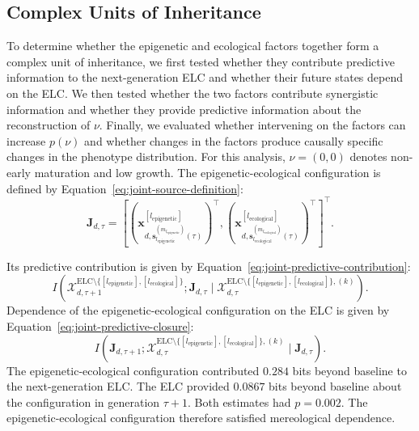 \documentclass[11pt]{article}
\newcommand{\ELC}{\mathrm{ELC}}
\begin{document}
\subsection{Complex Units of Inheritance}
To determine whether the epigenetic and ecological factors together form a complex unit of inheritance, we first tested whether they contribute predictive information to the next-generation ELC and whether their future states depend on the ELC. We then tested whether the two factors contribute synergistic information and whether they provide predictive information about the reconstruction of $\nu$. Finally, we evaluated whether intervening on the factors can increase $p(\nu)$ and whether changes in the factors produce causally specific changes in the phenotype distribution. For this analysis, $\nu=(0,0)$ denotes non-early maturation and low growth. The epigenetic-ecological configuration is defined by Equation~\ref{eq:joint-source-definition}:
\begin{equation}
\mathbf{J}_{d,\tau}
=
\left[
\left(
\mathbf{x}^{[l_{\mathrm{epigenetic}}]}_
{d,\mathbf{s}^{(m_{l_{\mathrm{epigenetic}}})}_{l_{\mathrm{epigenetic}}}(\tau)}
\right)^\top,
\left(
\mathbf{x}^{[l_{\mathrm{ecological}}]}_
{d,\mathbf{s}^{(m_{l_{\mathrm{ecological}}})}_{l_{\mathrm{ecological}}}(\tau)}
\right)^\top
\right]^\top .
\label{eq:joint-source-definition}
\end{equation}

Its predictive contribution is given by Equation~\ref{eq:joint-predictive-contribution}:
\begin{equation}
I\left(
\mathcal{X}^{\ELC\setminus
\{[l_{\mathrm{epigenetic}}],[l_{\mathrm{ecological}}]\}}_{d,\tau+1};
\mathbf{J}_{d,\tau}
\mid
\mathcal{X}^{\ELC\setminus
\{[l_{\mathrm{epigenetic}}],[l_{\mathrm{ecological}}]\},(k)}_{d,\tau}
\right).
\label{eq:joint-predictive-contribution}
\end{equation}
Dependence of the epigenetic-ecological configuration on the ELC is given by Equation~\ref{eq:joint-predictive-closure}:
\begin{equation}
I\left(
\mathbf{J}_{d,\tau+1};
\mathcal{X}^{\ELC\setminus
\{[l_{\mathrm{epigenetic}}],[l_{\mathrm{ecological}}]\},(k)}_{d,\tau}
\mid
\mathbf{J}_{d,\tau}
\right).
\label{eq:joint-predictive-closure}
\end{equation}
The epigenetic-ecological configuration contributed $0.284$ bits beyond baseline to the next-generation ELC. The ELC provided $0.0867$ bits beyond baseline about the configuration in generation $\tau+1$. Both estimates had $p=0.002$. The epigenetic-ecological configuration therefore satisfied mereological dependence.
\end{document}
